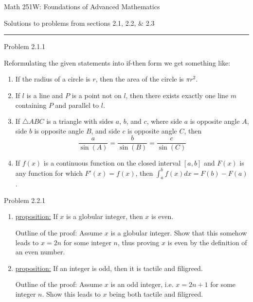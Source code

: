 \documentclass{article}
\theoremstyle{definition}
\begin{document}
	\begin{center}
		\Large{Math 251W: Foundations of Advanced Mathematics}

		\normalsize Solutions to problems from sections 2.1, 2.2, $\&$ 2.3
		\hrule \vspace{0.75cm}
	\end{center}


	\noindent Problem 2.1.1  \vspace{0.3cm}

	Reformulating the given statements into if-then form we get
	something like:

	\begin{enumerate}
		\item  If the radius of a circle is $r$, then the area of the circle
		is $\pi r^2$.
		\item  If $l$ is a line and $P$ is a point not on $l$, then there
		exists exactly one line $m$ containing $P$ and parallel to $l$.
		\item If $\triangle ABC$ is a triangle with sides $a$, $b$, and $c$,
		where side $a$ is opposite angle $A$, side $b$ is opposite angle
		$B$, and side $c$ is opposite angle $C$, then
		$$\frac{a}{\sin(A)}=\frac{b}{\sin(B)}=\frac{c}{\sin(C)}$$
		\item[5] If $f(x)$ is a continuous function on the closed interval
		$[a,b]$ and $F(x)$ is any function for which $F'(x)=f(x)$, then
		$\int_a^b f(x)dx=F(b)-F(a)$.
	\end{enumerate}

	\vspace{1cm}


	\noindent Problem 2.2.1  \vspace{0.3cm}

	\begin{enumerate}
		\item[2] \underline{proposition:} If $x$ is a globular integer, then
		$x$ is even.

		\vspace{.2cm}

		Outline of the proof: Assume $x$ is a globular integer. Show that
		this somehow leads to $x=2n$ for some integer $n$, thus proving $x$
		is even by the definition of an even number.

		\item[4] \underline{proposition:} If an integer is odd, then it is
		tactile and filigreed.

		\vspace{.2cm}

		Outline of the proof: Assume $x$ is an odd integer, i.e. $x=2n+1$
		for some integer $n$. Show this leads to $x$ being both tactile and
		filigreed.
	\end{enumerate}
\end{document}
